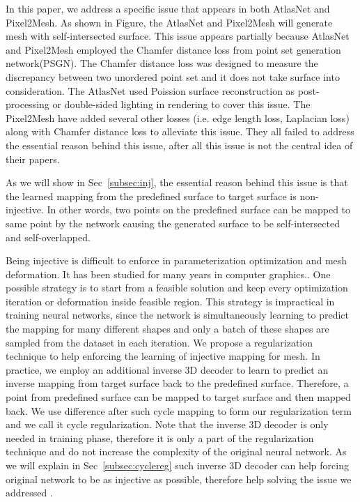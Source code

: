In this paper, we address a specific issue that appears in both AtlasNet\cite{atlasnet} and Pixel2Mesh\cite{pixel2mesh}. As shown in Figure, the AtlasNet and Pixel2Mesh will generate mesh with self-intersected surface. This issue appears partially because AtlasNet and Pixel2Mesh employed the Chamfer distance loss from point set generation network(PSGN)\cite{PSGN}. The Chamfer distance loss was designed to measure the discrepancy between two unordered point set and it does not take surface into consideration. The AtlasNet used Poission surface reconstruction as post-processing or double-sided lighting in rendering to cover this issue. The Pixel2Mesh have added several other losses (i.e. edge length loss, Laplacian loss) along with Chamfer distance loss to alleviate this issue. They all failed to address the essential reason behind this issue, after all this issue is not the central idea of their papers.

As we will show in Sec~\ref{subsec:inj}, the essential reason behind this issue is that the learned mapping from the predefined surface to target surface is non-injective. In other words, two points on the predefined surface can be mapped to same point by the network causing the generated surface to be self-intersected and self-overlapped. 

Being injective is difficult to enforce in parameterization optimization and mesh deformation. It has been studied for many years in computer graphics.. One possible strategy is to start from a feasible solution and keep every optimization iteration or deformation inside feasible region. This strategy is impractical in training neural networks, since the network is simultaneously learning to predict the mapping for many different shapes and only a batch of these shapes are sampled from the dataset in each iteration. We propose a regularization technique to help enforcing the learning of injective mapping for mesh. In practice, we employ an additional inverse 3D decoder to learn to predict an inverse mapping from target surface back to the predefined surface. Therefore, a point from predefined surface can be mapped to target surface and then mapped back. We use difference after such cycle mapping to form our regularization term and we call it cycle regularization. Note that the inverse 3D decoder is only needed in training phase, therefore it is only a part of the regularization technique and do not increase the complexity of the original neural network. As we will explain in Sec~\ref{subsec:cyclereg} such inverse 3D decoder can help forcing original network to be as injective as possible, therefore help solving the issue we addressed .

 